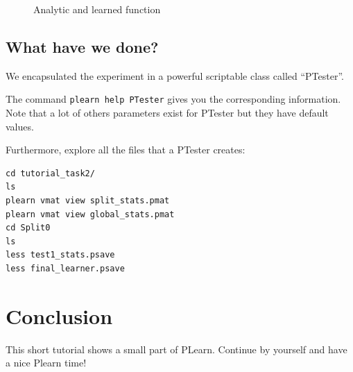 \begin{figure}
  \caption{Analytic and learned function}  
\label{reg}
\end{figure}

\subsection{What have we done?}

We encapsulated the experiment in a powerful scriptable class called ``PTester''.

The command \texttt{plearn help PTester} gives you the corresponding information.
Note that a lot of others parameters exist for PTester but they have default values.

Furthermore, explore all the files that a PTester creates:

\begin{verbatim}
cd tutorial_task2/
ls
plearn vmat view split_stats.pmat
plearn vmat view global_stats.pmat
cd Split0
ls
less test1_stats.psave
less final_learner.psave
\end{verbatim}


\section{Conclusion}
This short tutorial shows a small part of PLearn. Continue by yourself and have a nice Plearn time! 



